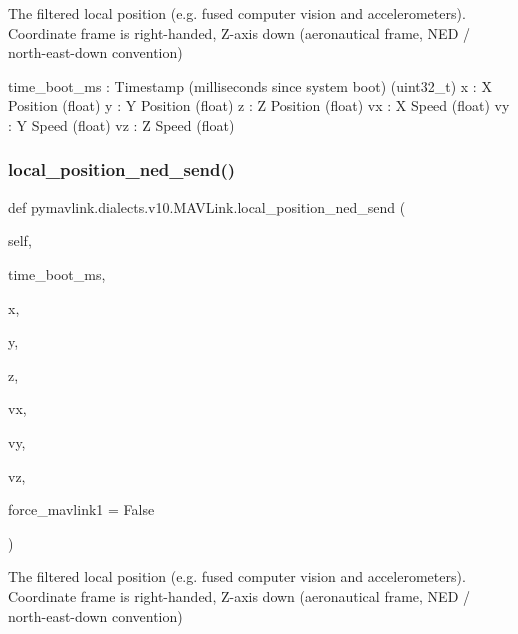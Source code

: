 \begin{DoxyVerb}
\begin{DoxyVerb}
\begin{DoxyVerb}
\begin{DoxyVerb}
\begin{DoxyVerb}The filtered local position (e.g. fused computer vision and
accelerometers). Coordinate frame is right-handed,
Z-axis down (aeronautical frame, NED / north-east-down
convention)

time_boot_ms              : Timestamp (milliseconds since system boot) (uint32_t)
x                         : X Position (float)
y                         : Y Position (float)
z                         : Z Position (float)
vx                        : X Speed (float)
vy                        : Y Speed (float)
vz                        : Z Speed (float)\end{DoxyVerb}
 \mbox{\label{classpymavlink_1_1dialects_1_1v10_1_1MAVLink_a7aafc2f725a4dafe05f8cd8de24ddf7c}} 
\subsubsection{\texorpdfstring{local\+\_\+position\+\_\+ned\+\_\+send()}{local\_position\_ned\_send()}}
{\footnotesize\ttfamily def pymavlink.\+dialects.\+v10.\+M\+A\+V\+Link.\+local\+\_\+position\+\_\+ned\+\_\+send (\begin{DoxyParamCaption}\item[{}]{self,  }\item[{}]{time\+\_\+boot\+\_\+ms,  }\item[{}]{x,  }\item[{}]{y,  }\item[{}]{z,  }\item[{}]{vx,  }\item[{}]{vy,  }\item[{}]{vz,  }\item[{}]{force\+\_\+mavlink1 = {\ttfamily False} }\end{DoxyParamCaption})}

\begin{DoxyVerb}The filtered local position (e.g. fused computer vision and
accelerometers). Coordinate frame is right-handed,
Z-axis down (aeronautical frame, NED / north-east-down
convention)


\end{DoxyVerb}
\end{DoxyVerb}
\end{DoxyVerb}
\end{DoxyVerb}
\end{DoxyVerb}
